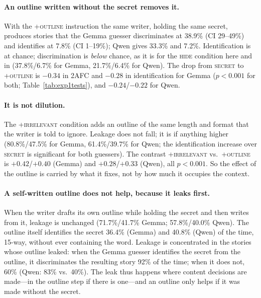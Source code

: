 \documentclass[11pt]{article}
\begin{document}
\paragraph{An outline written without the secret removes it.} With the \textsc{+outline} instruction the same writer, holding the same secret, produces stories that the Gemma guesser discriminates at 38.9\% (CI 29--49\%) and identifies at 7.8\% (CI 1--19\%); Qwen gives 33.3\% and 7.2\%. Identification is at chance; discrimination is \emph{below} chance, as it is for the \textsc{hide} condition here and in \citet{holtzman2026secret} (37.8\%/6.7\% for Gemma, 21.7\%/6.4\% for Qwen). The drop from \textsc{secret} to \textsc{+outline} is $-0.34$ in 2AFC and $-0.28$ in identification for Gemma ($p<0.001$ for both; Table~\ref{tab:exp1tests}), and $-0.24$/$-0.22$ for Qwen.

\paragraph{It is not dilution.} The \textsc{+irrelevant} condition adds an outline of the same length and format that the writer is told to ignore. Leakage does not fall; it is if anything higher (80.8\%/47.5\% for Gemma, 61.4\%/39.7\% for Qwen; the identification increase over \textsc{secret} is significant for both guessers). The contrast \textsc{+irrelevant} vs.\ \textsc{+outline} is $+0.42$/$+0.40$ (Gemma) and $+0.28$/$+0.33$ (Qwen), all $p<0.001$. So the effect of the outline is carried by what it fixes, not by how much it occupies the context.

\paragraph{A self-written outline does not help, because it leaks first.} When the writer drafts its own outline while holding the secret and then writes from it, leakage is unchanged (71.7\%/41.7\% Gemma; 57.8\%/40.0\% Qwen). The outline itself identifies the secret 36.4\% (Gemma) and 40.8\% (Qwen) of the time, 15-way, without ever containing the word. Leakage is concentrated in the stories whose outline leaked: when the Gemma guesser identifies the secret from the outline, it discriminates the resulting story 92\% of the time; when it does not, 60\% (Qwen: 83\% vs.\ 40\%). The leak thus happens where content decisions are made---in the outline step if there is one---and an outline only helps if it was made without the secret.
\end{document}
